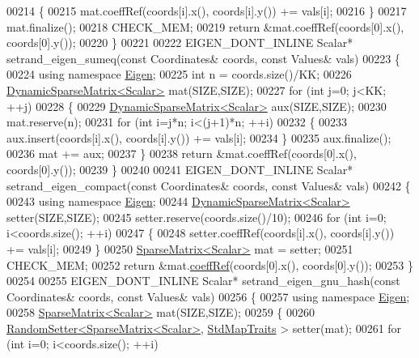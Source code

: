 \begin{DoxyCode}
00214   \{
00215     mat.coeffRef(coords[i].x(), coords[i].y()) += vals[i];
00216   \}
00217   mat.finalize();
00218   CHECK\_MEM;
00219   \textcolor{keywordflow}{return} &mat.coeffRef(coords[0].x(), coords[0].y());
00220 \}
00221 
00222 EIGEN\_DONT\_INLINE Scalar* setrand\_eigen\_sumeq(\textcolor{keyword}{const} Coordinates& coords, \textcolor{keyword}{const} Values& vals)
00223 \{
00224   \textcolor{keyword}{using namespace }\hyperlink{namespace_eigen}{Eigen};
00225   \textcolor{keywordtype}{int} n = coords.size()/KK;
00226   \hyperlink{class_eigen_1_1_dynamic_sparse_matrix}{DynamicSparseMatrix<Scalar>} mat(SIZE,SIZE);
00227   \textcolor{keywordflow}{for} (\textcolor{keywordtype}{int} j=0; j<KK; ++j)
00228   \{
00229     \hyperlink{class_eigen_1_1_dynamic_sparse_matrix}{DynamicSparseMatrix<Scalar>} aux(SIZE,SIZE);
00230     mat.reserve(n);
00231     \textcolor{keywordflow}{for} (\textcolor{keywordtype}{int} i=j*n; i<(j+1)*n; ++i)
00232     \{
00233       aux.insert(coords[i].x(), coords[i].y()) += vals[i];
00234     \}
00235     aux.finalize();
00236     mat += aux;
00237   \}
00238   \textcolor{keywordflow}{return} &mat.coeffRef(coords[0].x(), coords[0].y());
00239 \}
00240 
00241 EIGEN\_DONT\_INLINE Scalar* setrand\_eigen\_compact(\textcolor{keyword}{const} Coordinates& coords, \textcolor{keyword}{const} Values& vals)
00242 \{
00243   \textcolor{keyword}{using namespace }\hyperlink{namespace_eigen}{Eigen};
00244   \hyperlink{class_eigen_1_1_dynamic_sparse_matrix}{DynamicSparseMatrix<Scalar>} setter(SIZE,SIZE);
00245   setter.reserve(coords.size()/10);
00246   \textcolor{keywordflow}{for} (\textcolor{keywordtype}{int} i=0; i<coords.size(); ++i)
00247   \{
00248     setter.coeffRef(coords[i].x(), coords[i].y()) += vals[i];
00249   \}
00250   \hyperlink{group___sparse_core___module}{SparseMatrix<Scalar>} mat = setter;
00251   CHECK\_MEM;
00252   \textcolor{keywordflow}{return} &mat.\hyperlink{group___sparse_core___module_a013197b3f598968ff37ed8c97087f1ef}{coeffRef}(coords[0].x(), coords[0].y());
00253 \}
00254 
00255 EIGEN\_DONT\_INLINE Scalar* setrand\_eigen\_gnu\_hash(\textcolor{keyword}{const} Coordinates& coords, \textcolor{keyword}{const} Values& vals)
00256 \{
00257   \textcolor{keyword}{using namespace }\hyperlink{namespace_eigen}{Eigen};
00258   \hyperlink{group___sparse_core___module}{SparseMatrix<Scalar>} mat(SIZE,SIZE);
00259   \{
00260     \hyperlink{class_eigen_1_1_random_setter}{RandomSetter<SparseMatrix<Scalar>}, 
      \hyperlink{struct_eigen_1_1_std_map_traits}{StdMapTraits} > setter(mat);
00261     \textcolor{keywordflow}{for} (\textcolor{keywordtype}{int} i=0; i<coords.size(); ++i)

\end{DoxyCode}
